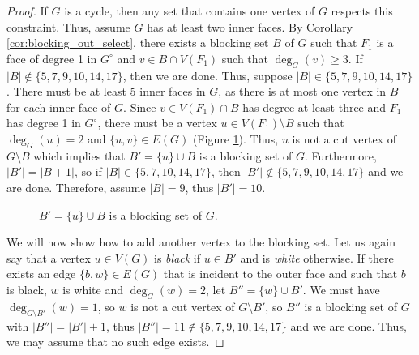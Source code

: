 \documentclass{patmorin}
\newcommand{\wdual}[1]{#1^{\circ}}
\begin{document}
\begin{proof}
 If $G$ is a cycle, then any set that contains one vertex of $G$ respects this constraint. Thus, assume $G$ has at least two inner faces.
 By Corollary \ref{cor:blocking_out_select}, there exists a blocking set $B$ of $G$ such that $F_1$ is a face of degree 1 in $\wdual{G}$ and $v \in B\cap V(F_1)$ such that $\deg_G(v) \geq 3$. 
 If $|B| \notin \{5, 7, 9, 10, 14, 17\}$, then we are done. Thus, suppose $|B| \in \{5, 7, 9, 10, 14, 17\}$. There must be at least 5 inner faces in $G$, as there is at most one vertex in $B$ for each inner face of $G$.
 Since $v \in V(F_1) \cap B$ has degree at least three and $F_1$ has degree 1 in  $\wdual{G}$, there must be a vertex $u \in V(F_1) \setminus B$ such that $\deg_G(u) =2$ and $\{u,v\}\in E(G)$ (Figure \ref{fig:addfirst}). Thus, $u$ is not a cut vertex of $G \setminus B$ which implies that $B' = \{u \} \cup B$ is a blocking set of $G$. Furthermore, $|B'|=|B+1|$, so if $|B| \in \{5, 7, 10, 14, 17\}$, then $|B'| \notin \{5, 7, 9, 10, 14, 17\}$ and we are done. Therefore, assume $|B|=9$, thus $|B'|=10$. 
 
  \begin{figure}[!ht]
  \centering
  

  \caption{$B'=\{u\} \cup B$ is a blocking set of $G$.}
  \label{fig:addfirst}  
\end{figure}
 
 We will now show how to add another vertex to the blocking set. Let us again say that a vertex $u\in V(G)$ is \emph{black} if $u \in B'$ and is \emph{white} otherwise. If there exists an edge $\{b,w\}\in E(G)$ that is incident to the outer face and such that $b$ is black, $w$ is white and $\deg_G(w)=2$, let $B''=\{w\} \cup B'$. We must have $\deg_{G \setminus B'}(w)=1$, so $w$ is not a cut vertex of $G \setminus B'$, so $B''$ is a blocking set of $G$ with $|B''|=|B'|+1$, thus $|B''|=11 \notin \{5, 7, 9, 10, 14, 17\}$ and we are done. Thus, we may assume that no such edge exists. 
 

\end{proof}
\end{document}
